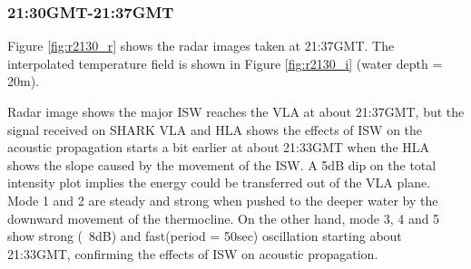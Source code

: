 \subsubsection{21:30GMT-21:37GMT}
Figure \ref{fig:r2130_r} shows the radar images taken at 21:37GMT. The interpolated temperature field is shown in Figure \ref{fig:r2130_i} (water depth = 20m). 

Radar image shows the major ISW reaches the VLA at about 21:37GMT,
but the signal received on SHARK VLA and HLA shows the effects of
ISW on the acoustic propagation starts a bit earlier at about
21:33GMT when the HLA shows the slope caused by the movement of the
ISW. A 5dB dip on the total intensity plot implies the energy could
be transferred out of the VLA plane. Mode 1 and 2 are steady and
strong when pushed to the deeper water by the downward movement of
the thermocline. On the other hand, mode 3, 4 and 5 show strong
(~8dB) and fast(period = 50sec) oscillation starting about 21:33GMT,
confirming the effects of ISW on acoustic propagation.



